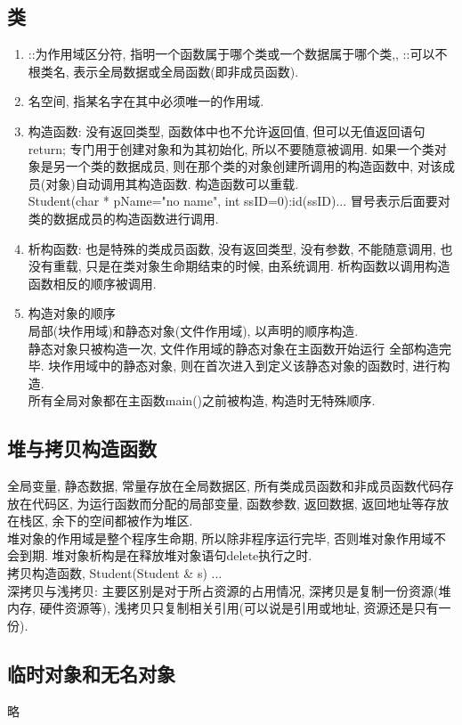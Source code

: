 \documentclass[a4paper,10pt,english]{article}
\begin{document}
\subsection{类}
\begin{enumerate}
\item {::}为作用域区分符, 指明一个函数属于哪个类或一个数据属于哪个类,, ::可以不根类名, 表示全局数据或全局函数(即非成员函数).
\item {名空间}, 指某名字在其中必须唯一的作用域. 
\item {构造函数}: 没有返回类型, 函数体中也不允许返回值, 但可以无值返回语句return; 专门用于创建对象和为其初始化, 所以不要随意被调用. 如果一个类对象是另一个类的数据成员, 则在那个类的对象创建所调用的构造函数中, 对该成员(对象)自动调用其构造函数. 构造函数可以重载. \\
Student(char * pName="no name", int ssID=0):id(ssID){...} 冒号表示后面要对类的数据成员的构造函数进行调用. 
\item {析构函数}: 也是特殊的类成员函数, 没有返回类型, 没有参数, 不能随意调用, 也没有重载, 只是在类对象生命期结束的时候, 由系统调用. 析构函数以调用构造函数相反的顺序被调用.
\item {构造对象的顺序} \\
局部(块作用域)和静态对象(文件作用域), 以声明的顺序构造. \\
静态对象只被构造一次, 文件作用域的静态对象在主函数开始运行 全部构造完毕. 块作用域中的静态对象, 则在首次进入到定义该静态对象的函数时, 进行构造. \\
所有全局对象都在主函数main()之前被构造, 构造时无特殊顺序. 
\end{enumerate}

\subsection{堆与拷贝构造函数}
全局变量, 静态数据, 常量存放在全局数据区, 所有类成员函数和非成员函数代码存放在代码区, 为运行函数而分配的局部变量, 函数参数, 返回数据, 返回地址等存放在栈区, 余下的空间都被作为堆区.\\
堆对象的作用域是整个程序生命期, 所以除非程序运行完毕, 否则堆对象作用域不会到期. 堆对象析构是在释放堆对象语句delete执行之时. \\
拷贝构造函数, Student(Student \& s) {...} \\
深拷贝与浅拷贝: 主要区别是对于所占资源的占用情况, 深拷贝是复制一份资源(堆内存, 硬件资源等), 浅拷贝只复制相关引用(可以说是引用或地址, 资源还是只有一份). 

\subsection{临时对象和无名对象}
略
\end{document}
